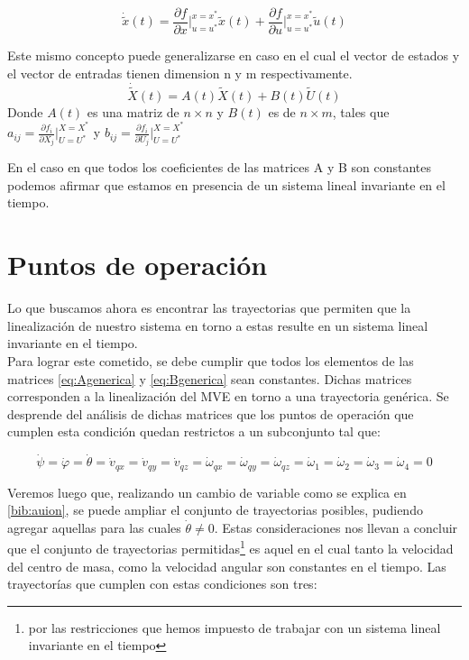 \documentclass[main]{subfiles}
\begin{document}
\begin{equation}
\dot{\tilde{x}}(t)=\frac{\partial f}{\partial x}\vert_{u=u^*}^{x=x^*}\tilde{x}(t)+\frac{\partial f}{\partial u}\vert_{u=u^*}^{x=x^*}\tilde{u}(t)
\end{equation}

Este mismo concepto puede generalizarse en caso en el cual el vector de estados y el vector de entradas tienen dimension n y m respectivamente.
\begin{equation}
\dot{\tilde{X}}(t)=A(t)\tilde{X}(t)+B(t)\tilde{U}(t)
\end{equation}
Donde $A(t)$ es una matriz de $n \times n$ y $B(t)$ es de $n \times m$, tales que $a_{ij}= \frac{\partial f_i}{\partial X_j}\vert_{U=U^*}^{X=X^*}$ y  $b_{ij}= \frac{\partial f_i}{\partial U_j}\vert_{U=U^*}^{X=X^*}$

En el caso en que todos los coeficientes de las matrices A y B son constantes podemos afirmar que estamos en presencia de un sistema lineal invariante en el tiempo. 

\section{Puntos de operaci\'on}
Lo que buscamos ahora es encontrar las trayectorias que permiten que la linealizaci\'on de nuestro sistema en torno a estas resulte en un sistema lineal invariante en el tiempo.\\

Para lograr este cometido, se debe cumplir que todos los elementos de las matrices \ref{eq:Agenerica} y \ref{eq:Bgenerica} sean constantes. Dichas matrices corresponden a la linealizaci\'on del MVE en torno a una trayectoria gen\'erica. Se desprende del an\'alisis de dichas matrices que los puntos de operaci\'on que cumplen esta condici\'on quedan restrictos a un subconjunto tal que: 

\begin{equation}
\dot{\psi}=\dot{\varphi}=\dot{\theta}=\dot{v}_{qx}=\dot{v}_{qy}=\dot{v}_{qz}=\dot{\omega}_{qx}=\dot{\omega}_{qy}=\dot{\omega}_{qz}=\dot{\omega}_1=\dot{\omega}_2=\dot{\omega}_3=\dot{\omega}_4=0
\end{equation}

Veremos luego que, realizando un cambio de variable como se explica en \ref{bib:auion}, se puede ampliar el conjunto de trayectorias posibles, pudiendo agregar aquellas para las cuales $\dot{\theta} \neq 0$. Estas consideraciones nos llevan a concluir que el conjunto de trayectorias permitidas\footnote{por las restricciones que hemos impuesto de trabajar con un sistema lineal invariante en el tiempo} es aquel en el cual tanto la velocidad del centro de masa, como la velocidad angular son constantes en el tiempo. Las trayector\'ias que cumplen con estas condiciones son tres:
\end{document}

